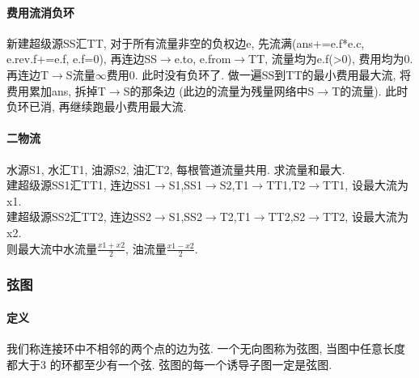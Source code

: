 	\paragraph{费用流消负环}
	\par 新建超级源SS汇TT, 对于所有流量非空的负权边e, 先流满(ans+=e.f*e.c, e.rev.f+=e.f, e.f=0), 再连边SS$\to$e.to, e.from$\to$TT, 流量均为e.f(>0), 费用均为0. 再连边T$\to$S流量$\infty$费用0. 此时没有负环了. 做一遍SS到TT的最小费用最大流, 将费用累加ans, 拆掉T$\to$S的那条边 (此边的流量为残量网络中S$\to$T的流量). 此时负环已消, 再继续跑最小费用最大流.
	\paragraph{二物流}
	\par 水源S1, 水汇T1, 油源S2, 油汇T2, 每根管道流量共用. 求流量和最大.\\
	建超级源SS1汇TT1, 连边SS1$\to$S1,SS1$\to$S2,T1$\to$TT1,T2$\to$TT1, 设最大流为x1.\\
	建超级源SS2汇TT2, 连边SS2$\to$S1,SS2$\to$T2,T1$\to$TT2,S2$\to$TT2, 设最大流为x2.\\
	则最大流中水流量$\frac{x1+x2}{2}$, 油流量$\frac{x1-x2}{2}$.
\begin{comment}
\subsubsection{割点于割边}
        \paragraph{割点 割边} 一个点$u$是割点, 当且仅当: 1. $u$为非树根且有树边$(u,v)$满足$dfn_u\leq low_v$; 2. u为树根且有多于一个的子树. 一条无向边$(u,v)$是桥, 当且仅当$(u,v)$是树边, 且满足$dfn_u<low_v$. 

\subsubsection{2-SAT}
    如果选$A$就必须选$B$就从$A$向$B$连一条边, 如果两个只能选一个的条件在同一个强连通分量中就不合法. 输出可行方案可以比较$X$和$X’$的$bl$的大小, 大的选$X’$. 建图优化一般考虑前后缀的合并. 
\end{comment}
\subsubsection{弦图}
				\paragraph{定义}我们称连接环中不相邻的两个点的边为弦. 一个无向图称为弦图, 当图中任意长度都大于$3$ 的环都至少有一个弦. 弦图的每一个诱导子图一定是弦图. 
